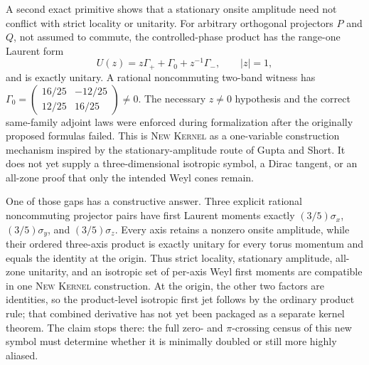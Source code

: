 \documentclass[11pt]{article}
\newcommand{\Kernel}{\textcolor{kernelcolor}{\textsc{Kernel}}}
\newcommand{\NewResult}{\textsc{New}}
\begin{document}
A second exact primitive shows that a stationary onsite amplitude need not
conflict with strict locality or unitarity.  For arbitrary orthogonal
projectors $P$ and $Q$, not assumed to commute, the controlled-phase product
has the range-one Laurent form
\[
 U(z)=z\Gamma_+ + \Gamma_0 + z^{-1}\Gamma_-,
 \qquad |z|=1,
\]
and is exactly unitary.  A rational noncommuting two-band witness has
$\Gamma_0=\left(\begin{smallmatrix}16/25&-12/25\\12/25&16/25\end{smallmatrix}\right)
\ne0$.  The necessary $z\ne0$ hypothesis and the correct same-family adjoint
laws were enforced during formalization after the originally proposed formulas
failed.  This is \NewResult{} \Kernel{} as a one-variable construction
mechanism inspired by the stationary-amplitude route of Gupta and Short.  It
does not yet supply a three-dimensional isotropic symbol, a Dirac tangent, or
an all-zone proof that only the intended Weyl cones remain.

One of those gaps has a constructive answer.  Three explicit rational
noncommuting projector pairs have first Laurent moments exactly
$(3/5)\sigma_x$, $(3/5)\sigma_y$, and $(3/5)\sigma_z$.  Every axis retains a
nonzero onsite amplitude, while their ordered three-axis product is exactly
unitary for every torus momentum and equals the identity at the origin.  Thus
strict locality, stationary amplitude, all-zone unitarity, and an isotropic
set of per-axis Weyl first moments are compatible in one \NewResult{} \Kernel{}
construction.  At the origin, the other two factors are identities, so the
product-level isotropic first jet follows by the ordinary product rule; that
combined derivative has not yet been packaged as a separate kernel theorem.
The claim stops there: the full zero- and $\pi$-crossing census of this new
symbol must determine whether it is minimally doubled or still more highly
aliased.
\end{document}
